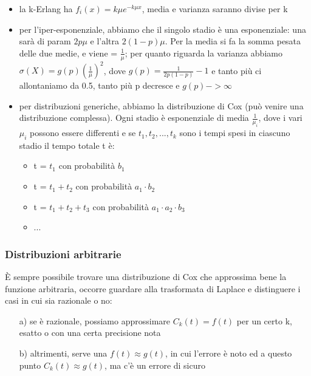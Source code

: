 \documentclass{article}
\begin{document}
\begin{itemize}
\item la k-Erlang ha $f_i(x) = k\mu e^{-k\mu x}$, media e varianza saranno divise per k
\item per l'iper-esponenziale, abbiamo che il singolo stadio  è una esponenziale: una sarà di param $2p \mu$ e l'altra $2(1 - p)\mu$. Per la media si fa la somma pesata delle due medie, e viene = $\frac{1}{\mu}$; per quanto riguarda la varianza abbiamo $\sigma(X) = g(p)(\frac{1}{\mu})^2$, dove $g(p) = \frac{1}{2p(1 - p)} - 1$ e tanto più ci allontaniamo da 0.5, tanto più p decresce e $g(p) -> \infty$
\item per distribuzioni generiche, abbiamo la distribuzione di Cox (può venire una distribuzione complessa). Ogni stadio è esponenziale di media $\frac{1}{\mu_i}$, dove i vari $\mu_i$ possono essere differenti e se $t_1, t_2, ..., t_k$ sono i tempi spesi in ciascuno stadio il tempo totale t è:
\begin{itemize}
\item t = $t_1$ con probabilità $b_1$
\item t = $t_1 + t_2$ con probabilità $a_1\cdot b_2$
\item t = $t_1 + t_2 + t_3$ con probabilità $a_1\cdot a_2 \cdot b_3$
\item ...
\end{itemize}
\end{itemize}
\subsubsection{Distribuzioni arbitrarie}
È sempre possibile trovare una distribuzione di Cox che approssima bene la funzione arbitraria, occorre guardare alla trasformata di Laplace e distinguere i casi in cui sia razionale o no:
\begin{itemize}
\item[a)] se è razionale, possiamo approssimare $C_k(t) = f(t)$ per un certo k, esatto o con una certa precisione nota
\item[b)] altrimenti, serve una $f(t) \approx g(t)$, in cui l'errore è noto ed a questo punto $C_k(t) \approx g(t)$, ma c'è un errore di sicuro
\end{itemize}
\end{document}
